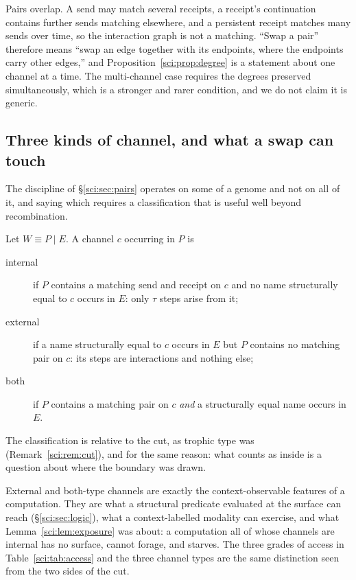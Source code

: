 \begin{remark}
\label{sci:rem:overlap}
Pairs overlap. A send may match several receipts, a receipt's continuation contains further sends
matching elsewhere, and a persistent receipt matches many sends over time, so the interaction graph is
not a matching. ``Swap a pair'' therefore means ``swap an edge together with its endpoints, where the
endpoints carry other edges,'' and Proposition~\ref{sci:prop:degree} is a statement about one channel at a
time. The multi-channel case requires the degrees preserved simultaneously, which is a stronger and
rarer condition, and we do not claim it is generic.
\end{remark}

\subsection{Three kinds of channel, and what a swap can touch}\label{sci:S12.6}
\label{sci:sec:chantypes}

The discipline of \S\ref{sci:sec:pairs} operates on some of a genome and not on all of it, and saying
which requires a classification that is useful well beyond recombination.

\begin{definition}
\label{sci:def:chantypes}
Let $W \equiv P \mid E$. A channel $c$ occurring in $P$ is
\begin{description}
\item[internal] if $P$ contains a matching send and receipt on $c$ and no name structurally equal to
$c$ occurs in $E$: only $\tau$ steps arise from it;
\item[external] if a name structurally equal to $c$ occurs in $E$ but $P$ contains no matching pair on
$c$: its steps are interactions and nothing else;
\item[both] if $P$ contains a matching pair on $c$ \emph{and} a structurally equal name occurs in $E$.
\end{description}
\end{definition}

The classification is relative to the cut, as trophic type was (Remark~\ref{sci:rem:cut}), and for the
same reason: what counts as inside is a question about where the boundary was drawn.

\begin{remark}
\label{sci:rem:surfacesyntax}
External and both-type channels are exactly the context-observable features of a computation. They
are what a structural predicate evaluated at the surface can reach (\S\ref{sci:sec:logic}), what a
context-labelled modality can exercise, and what Lemma~\ref{sci:lem:exposure} was about: a computation all
of whose channels are internal has no surface, cannot forage, and starves. The three grades of access
in Table~\ref{sci:tab:access} and the three channel types are the same distinction seen from the two sides
of the cut.
\end{remark}

